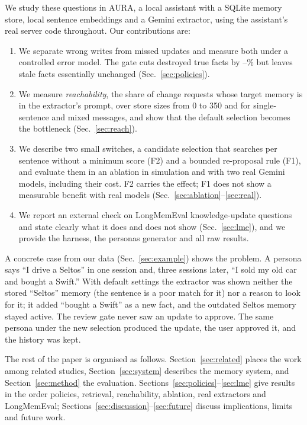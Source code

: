 \IfFileExists{IEEEtran.cls}{\documentclass[journal]{IEEEtran}\def\HAVEIEEE{1}}{\documentclass[10pt,twocolumn]{article}\usepackage[margin=0.7in,columnsep=0.25in]{geometry}}
\newcommand{\aura}{AURA}
\begin{document}
We study these questions in \aura, a local assistant with a SQLite memory store, local sentence embeddings and a Gemini extractor, using the assistant's real server code throughout. Our contributions are:
\begin{enumerate}
\item We separate wrong writes from missed updates and measure both under a controlled error model. The gate cuts destroyed true facts by \destroyRedMin--\destroyRedMax\% but leaves stale facts essentially unchanged (Sec.~\ref{sec:policies}).
\item We measure \emph{reachability}, the share of change requests whose target memory is in the extractor's prompt, over store sizes from 0 to 350 and for single-sentence and mixed messages, and show that the default selection becomes the bottleneck (Sec.~\ref{sec:reach}).
\item We describe two small switches, a candidate selection that searches per sentence without a minimum score (F2) and a bounded re-proposal rule (F1), and evaluate them in an ablation in simulation and with two real Gemini models, including their cost. F2 carries the effect; F1 does not show a measurable benefit with real models (Sec.~\ref{sec:ablation}--\ref{sec:real}).
\item We report an external check on LongMemEval knowledge-update questions and state clearly what it does and does not show (Sec.~\ref{sec:lme}), and we provide the harness, the personas generator and all raw results.
\end{enumerate}
A concrete case from our data (Sec.~\ref{sec:example}) shows the problem. A persona says ``I drive a Seltos'' in one session and, three sessions later, ``I sold my old car and bought a Swift.'' With default settings the extractor was shown neither the stored ``Seltos'' memory (the sentence is a poor match for it) nor a reason to look for it; it added ``bought a Swift'' as a new fact, and the outdated Seltos memory stayed active. The review gate never saw an update to approve. The same persona under the new selection produced the update, the user approved it, and the history was kept.

The rest of the paper is organised as follows. Section~\ref{sec:related} places the work among related studies, Section~\ref{sec:system} describes the memory system, and Section~\ref{sec:method} the evaluation. Sections~\ref{sec:policies}--\ref{sec:lme} give results in the order policies, retrieval, reachability, ablation, real extractors and LongMemEval; Sections~\ref{sec:discussion}--\ref{sec:future} discuss implications, limits and future work.
\end{document}
